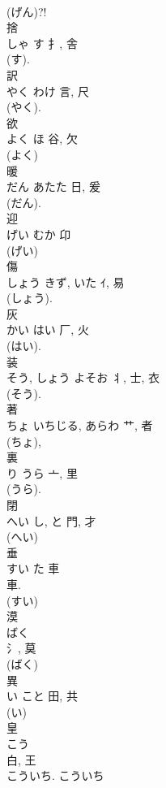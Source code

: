 \documentclass[8pt]{extreport}
\begin{document}
\begin{CJK}{UTF8}{min}
\\	(げん)?! 
\\	捨	
\\	しゃ	す	扌, 舎	
\\	(す). 
\\	訳	
\\	やく	わけ	言, 尺	
\\	(やく). 
\\	欲	
\\	よく	ほ	谷, 欠	
\\	(よく) 
\\	暖	
\\	だん	あたた	日, 爰	
\\	(だん). 
\\	迎	
\\	げい	むか	卬		
\\	(げい) 
\\	傷	
\\	しょう	きず, いた	ｲ, 易		
\\	(しょう). 
\\	灰	
\\	かい	はい	厂, 火	
\\	(はい). 
\\	装	
\\	そう, しょう	よそお	丬, 士, 衣	
\\	(そう). 
\\	著	
\\	ちょ	いちじる, あらわ	艹, 者	
\\	(ちょ), 
\\	裏	
\\	り	うら	亠, 里		
\\	(うら). 
\\	閉	
\\	へい	し, と	門, 才	
\\	(へい) 
\\	垂	
\\	すい	た	車	
\\	車. 
\\	(すい) 
\\	漠	
\\	ばく	
\\	氵, 莫	
\\	(ばく) 
\\	異	
\\	い	こと	田, 共	
\\	(い) 
\\	皇	
\\	こう	
\\	白, 王	
\\	こういち. こういち 

\end{CJK}
\end{document}
